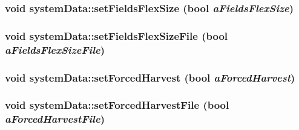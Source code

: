 \label{classsystem_data_a1ae32115c7a6a82767642d0ef891ed7d}
\hypertarget{classsystem_data_ae00a223b6f9014fa7ead9cbb5b9c98cb}{
\subsubsection[{setFieldsFlexSize}]{\setlength{\rightskip}{0pt plus 5cm}void systemData::setFieldsFlexSize (bool {\em aFieldsFlexSize})}}
\label{classsystem_data_ae00a223b6f9014fa7ead9cbb5b9c98cb}
\hypertarget{classsystem_data_a45e04b4802db3e711609183f8fad7610}{
\subsubsection[{setFieldsFlexSizeFile}]{\setlength{\rightskip}{0pt plus 5cm}void systemData::setFieldsFlexSizeFile (bool {\em aFieldsFlexSizeFile})}}
\label{classsystem_data_a45e04b4802db3e711609183f8fad7610}
\hypertarget{classsystem_data_ae35b9d86ccd7daeaa075d2f5c0ac8285}{
\subsubsection[{setForcedHarvest}]{\setlength{\rightskip}{0pt plus 5cm}void systemData::setForcedHarvest (bool {\em aForcedHarvest})}}
\label{classsystem_data_ae35b9d86ccd7daeaa075d2f5c0ac8285}
\hypertarget{classsystem_data_a3e15f78d6dfa9485cfeda6b81478ed28}{
\subsubsection[{setForcedHarvestFile}]{\setlength{\rightskip}{0pt plus 5cm}void systemData::setForcedHarvestFile (bool {\em aForcedHarvestFile})}}
